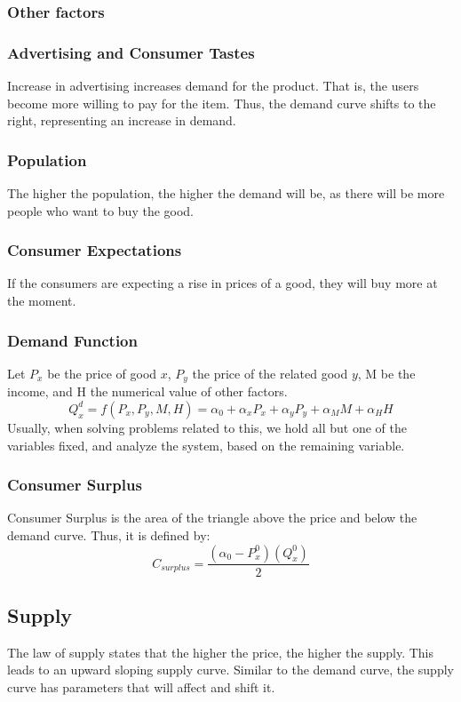 \documentclass[nobib]{article}
\begin{document}
\subsubsection{Other factors}
\subsubsection*{Advertising and Consumer Tastes}
Increase in advertising increases demand for the product. That is, the users become more willing to pay for the item. Thus, the demand curve shifts to the right, representing an increase in demand.
\subsubsection*{Population}
The higher the population, the higher the demand will be, as there will be more people who want to buy the good.
\subsubsection*{Consumer Expectations}
If the consumers are expecting a rise in prices of a good, they will buy more at the moment.
\subsubsection{Demand Function}
Let $P_x$ be the price of good $x$, $P_y$ the price of the related good $y$, M
be the income, and H the numerical value of other factors.\\
\begin{equation*}
    Q_x^d = f(P_x,P_y,M,H) = \alpha_0 + \alpha_x P_x + \alpha_y P_y +\alpha_M M+ \alpha_H H
\end{equation*}
Usually, when solving problems related to this, we  hold all but one of the variables fixed, and analyze the system, based on the remaining variable.\\
\subsubsection{Consumer Surplus}
Consumer Surplus is the area of the triangle above the price and below the
demand curve. Thus, it is defined by:
\begin{equation*}
    C_{surplus} = \frac{(\alpha_0 - P_x^0)(Q_x^0)}{2}
\end{equation*}
\subsection{Supply}
The law of supply states that the higher the price, the higher the supply. This
leads to an upward sloping supply curve. Similar to the demand curve, the
supply curve has parameters that will affect and shift it.\\
\end{document}
